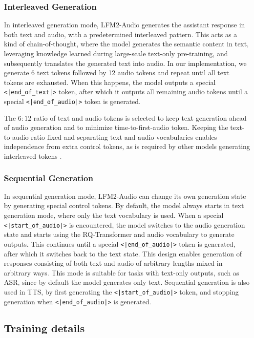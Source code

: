 \documentclass{article}
\begin{document}
\subsubsection{Interleaved Generation}
In interleaved generation mode, LFM2-Audio generates the assistant response in both text and audio, with a predetermined interleaved pattern. This acts as a kind of chain-of-thought, where the model generates the semantic content in text, leveraging knowledge learned during large-scale text-only pre-training, and subsequently translates the generated text into audio. In our implementation, we generate 6 text tokens followed by 12 audio tokens and repeat until all text tokens are exhausted. When this happens, the model outputs a special \texttt{<|end\_of\_text|>} token, after which it outputs all remaining audio tokens until a special \texttt{<|end\_of\_audio|>} token is generated.

The $6:12$ ratio of text and audio tokens is selected to keep text generation ahead of audio generation and to minimize time-to-first-audio token. Keeping the text-to-audio ratio fixed and separating text and audio vocabularies enables independence from extra control tokens, as is required by other models generating interleaved tokens \citep{li2025baichuan_audio, zeng2024glm4}.

\subsubsection{Sequential Generation}
In sequential generation mode, LFM2-Audio can change its own generation state by generating special control tokens. By default, the model always starts in text generation mode, where only the text vocabulary is used. When a special \texttt{<|start\_of\_audio|>} is encountered, the model switches to the audio generation state and starts using the RQ-Transformer and audio vocabulary to generate outputs. This continues until a special \texttt{<|end\_of\_audio|>} token is generated, after which it switches back to the text state. This design enables generation of responses consisting of both text and audio of arbitrary lengths mixed in arbitrary ways. This mode is suitable for tasks with text-only outputs, such as ASR, since by default the model generates only text. Sequential generation is also used in TTS, by first generating the \texttt{<|start\_of\_audio|>} token, and stopping generation when \texttt{<|end\_of\_audio|>} is generated.

\subsection{Training details}
\label{sec:audio_training}
\end{document}
